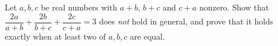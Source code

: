 Let $a,b,c$ be real numbers with $a+b$, $b+c$ and $c+a$ nonzero. Show that $\dfrac{2a}{a+b}+\dfrac{2b}{b+c}+\dfrac{2c}{c+a}=3$ does \emph{not} hold in general, and prove that it holds exactly when at least two of $a,b,c$ are equal.
